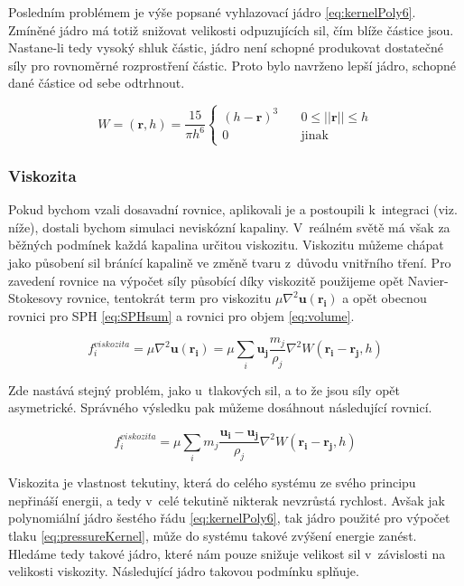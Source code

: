 Posledním problémem je výše popsané vyhlazovací jádro \ref{eq:kernelPoly6}. Zmíněné jádro má totiž snižovat velikosti odpuzujících sil, čím blíže částice jsou. Nastane-li tedy vysoký shluk částic, jádro není schopné produkovat dostatečné síly pro rovnoměrné rozprostření částic. Proto bylo navrženo \cite{Desbrun96} lepší jádro, schopné dané částice od sebe odtrhnout.

\begin{equation}
    W = (\mathbf{r}, h) = \frac{15}{\pi h^6} 
    \begin{cases}
      (h - \mathbf{r})^3 & \quad 0 \leq ||\mathbf{r}|| \leq h \\
      0 & \quad \text{jinak}
    \end{cases}
    \label{eq:pressureKernel}
\end{equation}
    
\subsubsection{Viskozita}
Pokud bychom vzali dosavadní rovnice, aplikovali je a postoupili k~integraci (viz. níže), dostali bychom simulaci neviskózní kapaliny. V~reálném světě má však za běžných podmínek každá kapalina určitou viskozitu. Viskozitu můžeme chápat jako působení sil bránící kapalině ve změně tvaru z~důvodu vnitřního tření. Pro zavedení rovnice na výpočet síly působící díky viskozitě použijeme opět Navier-Stokesovy rovnice, tentokrát term pro viskozitu $\mu \nabla^2\mathbf{u}(\mathbf{r_i})$ a opět obecnou rovnici pro SPH \ref{eq:SPHsum} a rovnici pro objem \ref{eq:volume}.

\begin{equation}
    f^{viskozita}_i = \mu \nabla^2\mathbf{u}(\mathbf{r_i}) = \mu \sum_i \mathbf{u_j} \frac{m_j}{\rho_j} \nabla^2 W(\mathbf{r_i} - \mathbf{r_j},h)
\end{equation}

Zde nastává stejný problém, jako u~tlakových sil, a to že jsou síly opět asymetrické. Správného výsledku pak můžeme dosáhnout následující rovnicí. \cite{Muller03}

\begin{equation}
    f^{viskozita}_i = \mu \sum_i m_j \frac{\mathbf{u_i} - \mathbf{u_j}}{\rho_j} \nabla^2 W(\mathbf{r_i} - \mathbf{r_j},h)
    \label{eq:ViscForce}
\end{equation}

Viskozita je vlastnost tekutiny, která do celého systému ze svého principu nepřináší energii, a tedy v~celé tekutině nikterak nevzrůstá rychlost. Avšak jak polynomiální jádro šestého řádu \ref{eq:kernelPoly6}, tak jádro použité pro výpočet tlaku \ref{eq:pressureKernel}, může do systému takové zvýšení energie zanést. Hledáme tedy takové jádro, které nám pouze snižuje velikost sil v~závislosti na velikosti viskozity. Následující jádro takovou podmínku splňuje. \cite{Muller03}

